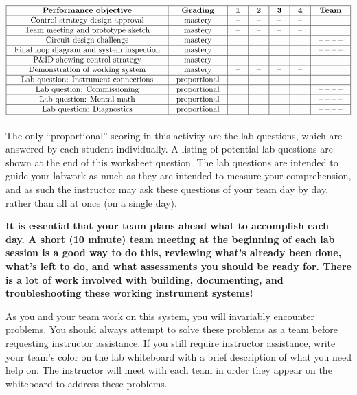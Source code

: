 $$\vbox{\offinterlineskip
\halign{\strut
\vrule \quad\hfil # \ \hfil & 
\vrule \quad\hfil # \ \hfil & 
\vrule \quad\hfil # \ \hfil & 
\vrule \quad\hfil # \ \hfil & 
\vrule \quad\hfil # \ \hfil & 
\vrule \quad\hfil # \ \hfil & 
\vrule \quad\hfil # \ \hfil \vrule \cr
\noalign{\hrule}
%
{\bf Performance objective} & {\bf Grading} & {\bf 1} & {\bf 2} & {\bf 3} & {\bf 4} & {\bf Team} \cr
%
\noalign{\hrule}
%
Control strategy design approval & mastery & -- & -- & -- & -- & \cr
%
\noalign{\hrule}
%
Team meeting and prototype sketch & mastery & -- & -- & -- & -- & \cr
%
\noalign{\hrule}
%
Circuit design challenge & mastery & & & & & -- -- -- -- \cr
%
\noalign{\hrule}
%
Final loop diagram and system inspection & mastery & & & & & -- -- -- -- \cr
%
\noalign{\hrule}
%
P\&ID showing control strategy & mastery & & & & & -- -- -- -- \cr
%
\noalign{\hrule}
%
Demonstration of working system & mastery & -- & -- & -- & -- & \cr
%
\noalign{\hrule}
%
Lab question: Instrument connections & proportional &  &  &  &  & -- -- -- -- \cr
%
\noalign{\hrule}
%
Lab question: Commissioning & proportional &  &  &  &  & -- -- -- -- \cr
%
\noalign{\hrule}
%
Lab question: Mental math & proportional &  &  &  &  & -- -- -- -- \cr
%
\noalign{\hrule}
%
Lab question: Diagnostics & proportional &  &  &  &  & -- -- -- -- \cr
%
\noalign{\hrule}
} %
}$$ %

The only ``proportional'' scoring in this activity are the lab questions, which are answered by each student individually.  A listing of potential lab questions are shown at the end of this worksheet question.  The lab questions are intended to guide your labwork as much as they are intended to measure your comprehension, and as such the instructor may ask these questions of your team day by day, rather than all at once (on a single day).

\vskip 10pt

{\bf It is essential that your team plans ahead what to accomplish each day.  A short (10 minute) team meeting at the beginning of each lab session is a good way to do this, reviewing what's already been done, what's left to do, and what assessments you should be ready for.  There is a lot of work involved with building, documenting, and troubleshooting these working instrument systems!}

As you and your team work on this system, you will invariably encounter problems.  You should always attempt to solve these problems as a team before requesting instructor assistance.  If you still require instructor assistance, write your team's color on the lab whiteboard with a brief description of what you need help on.  The instructor will meet with each team in order they appear on the whiteboard to address these problems.






